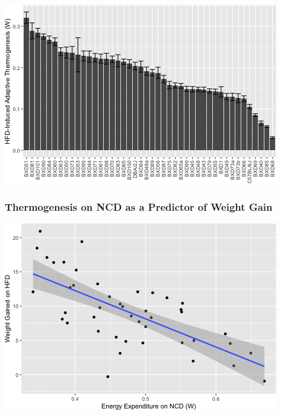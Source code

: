 \documentclass[]{article}
\newenvironment{Shaded}{\begin{snugshade}}{\end{snugshade}}
\newcommand{\DataTypeTok}[1]{\textcolor[rgb]{0.13,0.29,0.53}{#1}}
\newcommand{\KeywordTok}[1]{\textcolor[rgb]{0.13,0.29,0.53}{\textbf{#1}}}
\newcommand{\NormalTok}[1]{#1}
\newcommand{\OperatorTok}[1]{\textcolor[rgb]{0.81,0.36,0.00}{\textbf{#1}}}
\newcommand{\StringTok}[1]{\textcolor[rgb]{0.31,0.60,0.02}{#1}}
\begin{document}
\includegraphics{figures/adaptive-thermogenesis-1.png}

\hypertarget{thermogenesis-on-ncd-as-a-predictor-of-weight-gain}{%
\subsubsection{Thermogenesis on NCD as a Predictor of Weight
Gain}\label{thermogenesis-on-ncd-as-a-predictor-of-weight-gain}}

\begin{Shaded}
\end{Shaded}

\includegraphics{figures/thermogenesis-weight-1.png}
\end{document}
